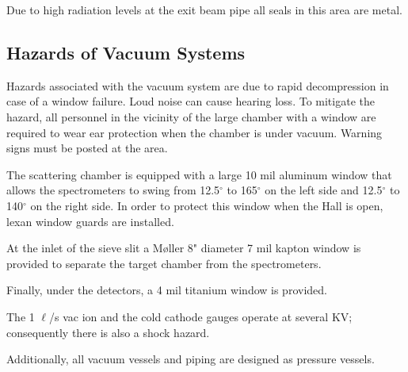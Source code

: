 Due to high radiation levels at the exit beam pipe all seals in
this area are metal.


\begin{safetyen}{10}{5}
\section{Hazards of Vacuum Systems}
\end{safetyen}

Hazards associated with the vacuum system are due to rapid 
decompression in case of a window failure. Loud noise can cause hearing
loss.  To mitigate the hazard, all personnel in the vicinity of the 
large chamber with a window are required to wear ear protection when
the chamber is under vacuum. Warning signs must be posted at the area.

The scattering chamber is equipped with a large 10 mil aluminum window that 
allows the spectrometers to swing from 12.5$^{\circ}$ to 165$^{\circ}$ 
on the left side and 12.5$^{\circ}$ to 140$^{\circ}$ on the right side. 
In order to
protect this window when the Hall is open, lexan window guards are
installed.

At the inlet of the sieve slit a M{\o}ller 8" diameter 7 mil kapton window 
is provided to separate the target chamber from the spectrometers.

Finally, under the detectors, a 4 mil titanium window is provided.  

The 1 $\ell$/s vac ion and the cold cathode gauges operate at several 
KV; consequently there is also a shock hazard.

Additionally, all vacuum vessels and piping are designed as pressure 
vessels.

%
